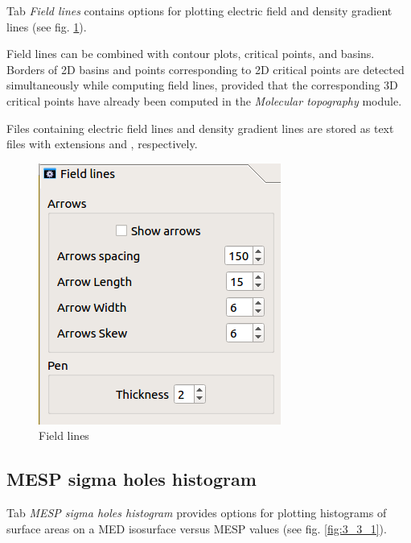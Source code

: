 \documentclass[10pt]{article}
\begin{document}
\begin{minipage}{0.5\linewidth}
 
Tab {\it Field lines} contains options for plotting electric field and density gradient lines  
(see fig. \ref{fig:3_5}).  

Field lines can be combined with contour plots, critical points, and basins.  
Borders of 2D basins and points corresponding to 2D critical points  
are detected simultaneously while computing field lines,  
provided that the corresponding 3D critical points  
have already been computed in the {\it Molecular topography} module.  

Files containing electric field lines and density gradient lines  
are stored as text files with extensions \camdosD{} and \dengrdosD{}, respectively.  


\end{minipage}
\begin{minipage}{0.49\linewidth}
 \begin{figure}[H]
    \begin{center}
        \vspace*{1mm}
        \includegraphics[width=.45\linewidth]{damqt_fig_3_5.png}
    \end{center}
    \vspace*{1mm}
    \caption{Field lines \label{fig:3_5}}
\end{figure}
\end{minipage}

\subsection{MESP sigma holes histogram \label{sec:3.3}}

Tab {\it MESP sigma holes histogram} provides options  
for plotting histograms of surface areas on a MED isosurface versus MESP values  
(see fig. \ref{fig:3_3_1}).  
\end{document}
